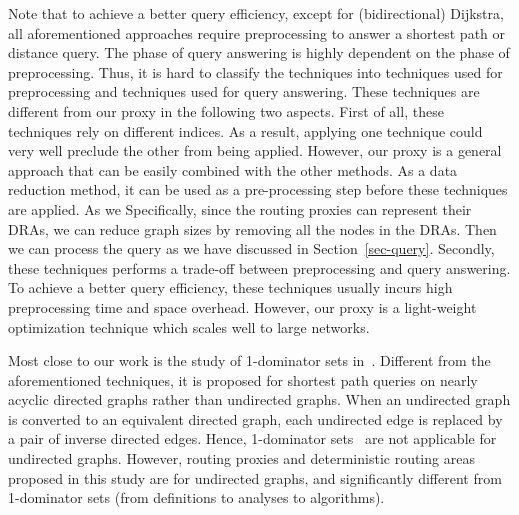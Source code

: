 Note that to achieve a better query efficiency, except for (bidirectional) Dijkstra, all aforementioned approaches require preprocessing to answer a shortest path or distance query. The phase of query answering is highly dependent on the phase of preprocessing. Thus, it is hard to classify the techniques into techniques used for preprocessing and techniques used for query answering. These techniques are different from our proxy in the following two aspects. First of all, these techniques rely on different indices. As a result, applying one technique could very well preclude the other from being applied. However, our proxy is a general approach that can be easily combined with the other methods. As a data reduction method, it can be used as a pre-processing step before these techniques are applied. As we Specifically, since the routing proxies can represent their DRAs, we can reduce graph sizes by removing all the nodes in the DRAs. Then we can process the query as we have discussed in Section~\ref{sec-query}. Secondly, these techniques performs a trade-off between preprocessing and query answering. To achieve a better query efficiency, these techniques usually incurs high preprocessing time and space overhead. However, our proxy is a light-weight optimization technique which scales well to large networks.


Most close to our work is the study of 1-dominator sets in~\cite{SaundersT07}. Different from the aforementioned techniques, it is proposed for shortest path queries on nearly acyclic directed graphs rather than undirected graphs. When an undirected graph is converted to an equivalent directed graph, each undirected edge is replaced by a pair of inverse directed edges. Hence, 1-dominator sets~\cite{SaundersT07} are not applicable for undirected graphs. However, routing proxies and deterministic routing areas proposed in this study  are for undirected graphs,  and  significantly different from 1-dominator sets (from definitions to analyses to algorithms).








